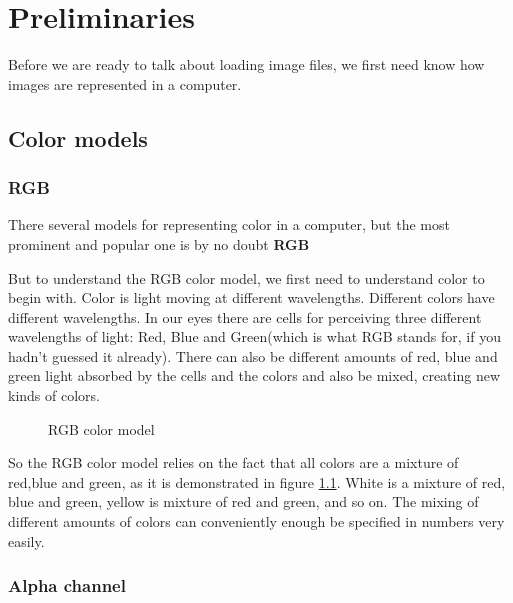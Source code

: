 \begin{comment}
  
\end{comment}

\chapter{Preliminaries}
\label{cha:preliminaries}

Before we are ready to talk about loading image files, we first need
know how images are represented in a computer.

\section{Color models}
\label{sec:color-models}

\subsection{RGB}
\label{sec:rgb}

There several models for representing color in a computer, but the
most prominent and popular one is by no doubt \textbf{RGB} 

But to understand the RGB color model, we first need to understand
color to begin with. Color is light moving at different
wavelengths. Different colors have different wavelengths. In our eyes
there are cells for perceiving three different wavelengths of light:
Red, Blue and Green(which is what RGB stands for, if you hadn't guessed
it already). There can also be different amounts of red, blue
and green light absorbed by the cells and the colors and also be
mixed, creating new kinds of colors. \cite{neider93:_openg_progr_guide}

\begin{figure}[h]
  \centering
  
  \caption{RGB color model}
  \label{fig:rgb}
\end{figure}

So the RGB color model relies on the fact that all colors are a
mixture of red,blue and green, as it is demonstrated in figure
\ref{fig:rgb}. White is a mixture of red, blue and green, yellow is
mixture of red and green, and so on. The mixing of different amounts
of colors can conveniently enough be specified in numbers very
easily.

\subsection{Alpha channel}
\label{sec:alpha_chan}


